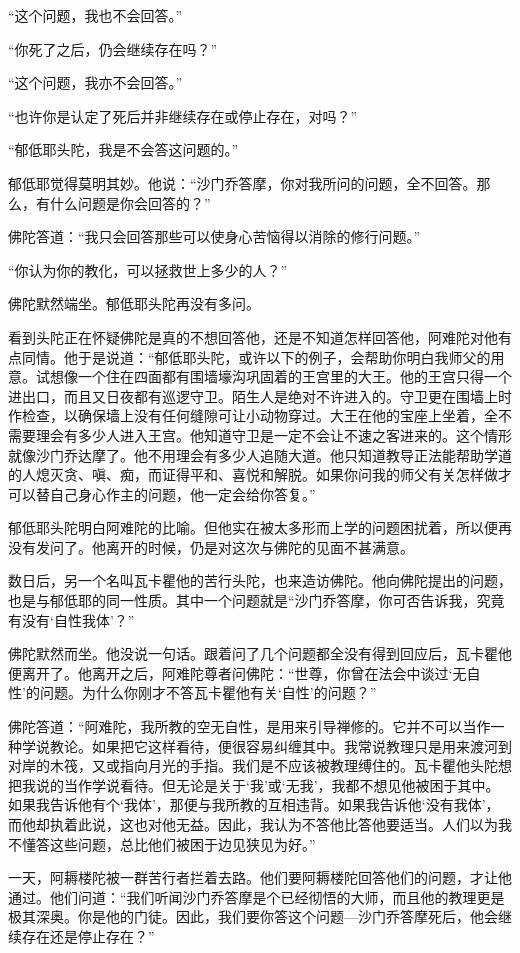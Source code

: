 \documentclass[12pt,twoside,openany]{book}
\begin{document}
“这个问题，我也不会回答。”

“你死了之后，仍会继续存在吗？”

“这个问题，我亦不会回答。”

“也许你是认定了死后并非继续存在或停止存在，对吗？”

“郁低耶头陀，我是不会答这问题的。”

郁低耶觉得莫明其妙。他说：“沙门乔答摩，你对我所问的问题，全不回答。那么，有什么问题是你会回答的？”

佛陀答道：“我只会回答那些可以使身心苦恼得以消除的修行问题。”

“你认为你的教化，可以拯救世上多少的人？”

佛陀默然端坐。郁低耶头陀再没有多问。

看到头陀正在怀疑佛陀是真的不想回答他，还是不知道怎样回答他，阿难陀对他有点同情。他于是说道：“郁低耶头陀，或许以下的例子，会帮助你明白我师父的用意。试想像一个住在四面都有围墙壕沟巩固着的王宫里的大王。他的王宫只得一个进出口，而且又日夜都有巡逻守卫。陌生人是绝对不许进入的。守卫更在围墙上时作检查，以确保墙上没有任何缝隙可让小动物穿过。大王在他的宝座上坐着，全不需要理会有多少人进入王宫。他知道守卫是一定不会让不速之客进来的。这个情形就像沙门乔达摩了。他不用理会有多少人追随大道。他只知道教导正法能帮助学道的人熄灭贪、嗔、痴，而证得平和、喜悦和解脱。如果你问我的师父有关怎样做才可以替自己身心作主的问题，他一定会给你答复。”

郁低耶头陀明白阿难陀的比喻。但他实在被太多形而上学的问题困扰着，所以便再没有发问了。他离开的时候，仍是对这次与佛陀的见面不甚满意。

数日后，另一个名叫瓦卡瞿他的苦行头陀，也来造访佛陀。他向佛陀提出的问题，也是与郁低耶的同一性质。其中一个问题就是“沙门乔答摩，你可否告诉我，究竟有没有‘自性我体’？”

佛陀默然而坐。他没说一句话。跟着问了几个问题都全没有得到回应后，瓦卡瞿他便离开了。他离开之后，阿难陀尊者问佛陀：“世尊，你曾在法会中谈过‘无自性’的问题。为什么你刚才不答瓦卡瞿他有关‘自性’的问题？”

佛陀答道：“阿难陀，我所教的空无自性，是用来引导禅修的。它并不可以当作一种学说教论。如果把它这样看待，便很容易纠缠其中。我常说教理只是用来渡河到对岸的木筏，又或指向月光的手指。我们是不应该被教理缚住的。瓦卡瞿他头陀想把我说的当作学说看待。但无论是关于‘我’或‘无我’，我都不想见他被困于其中。如果我告诉他有个‘我体’，那便与我所教的互相违背。如果我告诉他‘没有我体’，而他却执着此说，这也对他无益。因此，我认为不答他比答他要适当。人们以为我不懂答这些问题，总比他们被困于边见狭见为好。”

一天，阿耨楼陀被一群苦行者拦着去路。他们要阿耨楼陀回答他们的问题，才让他通过。他们问道：“我们听闻沙门乔答摩是个已经彻悟的大师，而且他的教理更是极其深奥。你是他的门徒。因此，我们要你答这个问题---沙门乔答摩死后，他会继续存在还是停止存在？”
\end{document}
